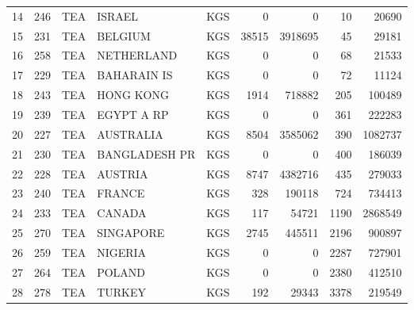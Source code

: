 \begin{tabular}{lrlllrrrr}
14 &    246 &       TEA &           ISRAEL &  KGS &                 0 &                  0 &                10 &              20690 \\
15 &    231 &       TEA &          BELGIUM &  KGS &             38515 &            3918695 &                45 &              29181 \\
16 &    258 &       TEA &       NETHERLAND &  KGS &                 0 &                  0 &                68 &              21533 \\
17 &    229 &       TEA &      BAHARAIN IS &  KGS &                 0 &                  0 &                72 &              11124 \\
18 &    243 &       TEA &        HONG KONG &  KGS &              1914 &             718882 &               205 &             100489 \\
19 &    239 &       TEA &       EGYPT A RP &  KGS &                 0 &                  0 &               361 &             222283 \\
20 &    227 &       TEA &        AUSTRALIA &  KGS &              8504 &            3585062 &               390 &            1082737 \\
21 &    230 &       TEA &    BANGLADESH PR &  KGS &                 0 &                  0 &               400 &             186039 \\
22 &    228 &       TEA &          AUSTRIA &  KGS &              8747 &            4382716 &               435 &             279033 \\
23 &    240 &       TEA &           FRANCE &  KGS &               328 &             190118 &               724 &             734413 \\
24 &    233 &       TEA &           CANADA &  KGS &               117 &              54721 &              1190 &            2868549 \\
25 &    270 &       TEA &        SINGAPORE &  KGS &              2745 &             445511 &              2196 &             900897 \\
26 &    259 &       TEA &          NIGERIA &  KGS &                 0 &                  0 &              2287 &             727901 \\
27 &    264 &       TEA &           POLAND &  KGS &                 0 &                  0 &              2380 &             412510 \\
28 &    278 &       TEA &           TURKEY &  KGS &               192 &              29343 &              3378 &             219549 \\

\end{tabular}
